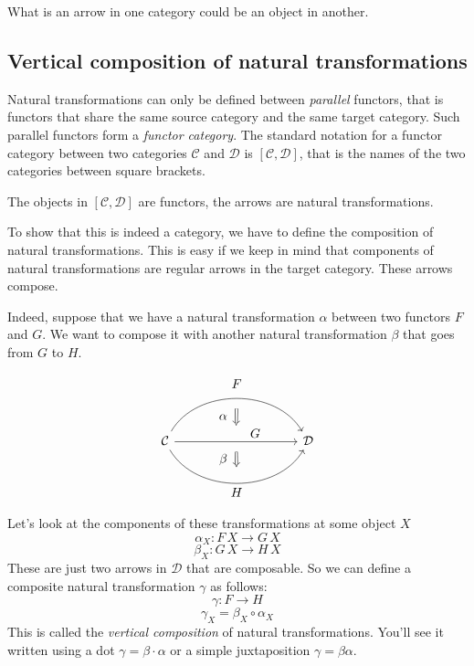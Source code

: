 \documentclass[DaoFP]{subfiles}
\begin{document}
What is an arrow in one category could be an object in another.

\subsection{Vertical composition of natural transformations}

Natural transformations can only be defined between \emph{parallel} functors, that is functors that share the same source category and the same target category. Such parallel functors form a \emph{functor category}. The standard notation for a functor category between two categories $\mathcal{C}$ and $\mathcal{D}$ is $[\mathcal{C}, \mathcal{D}]$, that is the names of the two categories between square brackets.

The objects in $[\mathcal{C}, \mathcal{D}]$ are functors, the arrows are natural transformations. 

To show that this is indeed a category, we have to define the composition of natural transformations. This is easy if we keep in mind that components of natural transformations are regular arrows in the target category. These arrows compose.

Indeed, suppose that we have a natural transformation $\alpha$ between two functors $F$ and $G$. We want to compose it with another natural transformation $\beta$ that goes from $G$ to $H$. 

\[
\begin{tikzcd}[column sep=huge]
\mathcal{C}
  \arrow[bend left=60]{rr}[name=U, label=above:$F$]{}
  \arrow[]{rr}[name=M, label={[xshift=15pt, yshift=-5pt]:$G$}]{} 
  \arrow[bend right=60]{rr}[name=D, label=below:$H$]{} 
 &&
\mathcal{D}
  \arrow[shorten <=8pt, shorten >=8pt,Rightarrow, to path={(U) -- node[label=left:$\alpha$] {} (M)}]{}
  \arrow[shorten <=8pt, shorten >=8pt,Rightarrow, to path={(M) -- node[label=left:$\beta$] {} (D)}]{}
\end{tikzcd}
\]


Let's look at the components of these transformations at some object $X$
\[ \alpha_X \colon F \, X \to G \, X \]
\[ \beta_X \colon G \, X \to H \, X \]
These are just two arrows in $\mathcal{D}$ that are composable. So we can define a composite natural transformation $\gamma$ as follows:
\[ \gamma \colon F \to H\]
\[ \gamma_X = \beta_X \circ \alpha_X \]
 This is called the \emph{vertical composition} of natural transformations. You'll see it written using a dot $\gamma = \beta \cdot \alpha$ or a simple juxtaposition $\gamma = \beta \alpha$.
\end{document}
